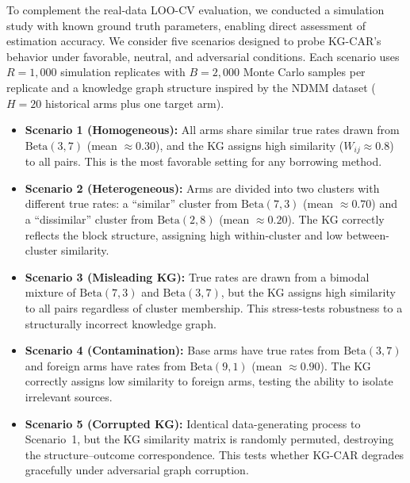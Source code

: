 \documentclass[12pt]{article}
\begin{document}
To complement the real-data LOO-CV evaluation, we conducted a simulation study with known ground truth parameters, enabling direct assessment of estimation accuracy. We consider five scenarios designed to probe KG-CAR's behavior under favorable, neutral, and adversarial conditions. Each scenario uses $R = 1{,}000$ simulation replicates with $B = 2{,}000$ Monte Carlo samples per replicate and a knowledge graph structure inspired by the NDMM dataset ($H = 20$ historical arms plus one target arm).

\begin{itemize}
\item \textbf{Scenario 1 (Homogeneous):} All arms share similar true rates drawn from $\text{Beta}(3, 7)$ (mean $\approx 0.30$), and the KG assigns high similarity ($W_{ij} \approx 0.8$) to all pairs. This is the most favorable setting for any borrowing method.

\item \textbf{Scenario 2 (Heterogeneous):} Arms are divided into two clusters with different true rates: a ``similar'' cluster from $\text{Beta}(7, 3)$ (mean $\approx 0.70$) and a ``dissimilar'' cluster from $\text{Beta}(2, 8)$ (mean $\approx 0.20$). The KG correctly reflects the block structure, assigning high within-cluster and low between-cluster similarity.

\item \textbf{Scenario 3 (Misleading KG):} True rates are drawn from a bimodal mixture of $\text{Beta}(7, 3)$ and $\text{Beta}(3, 7)$, but the KG assigns high similarity to all pairs regardless of cluster membership. This stress-tests robustness to a structurally incorrect knowledge graph.

\item \textbf{Scenario 4 (Contamination):} Base arms have true rates from $\text{Beta}(3, 7)$ and foreign arms have rates from $\text{Beta}(9, 1)$ (mean $\approx 0.90$). The KG correctly assigns low similarity to foreign arms, testing the ability to isolate irrelevant sources.

\item \textbf{Scenario 5 (Corrupted KG):} Identical data-generating process to Scenario~1, but the KG similarity matrix is randomly permuted, destroying the structure--outcome correspondence. This tests whether KG-CAR degrades gracefully under adversarial graph corruption.
\end{itemize}
\end{document}
